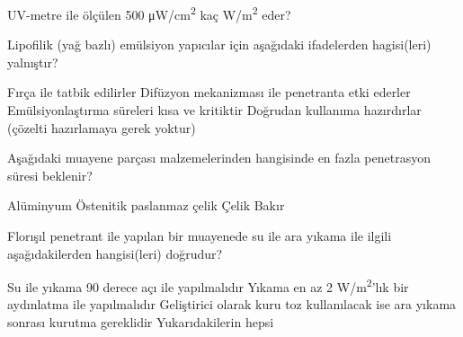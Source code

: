 \begin{question}[subtitle=]
  UV-metre ile ölçülen 500 \si[per-mode=symbol]{\micro\watt\per\centi\m^{2}} kaç \si[per-mode=symbol]
{\watt\per\m^{2}} eder?
	\begin{tasks}
           \correct
	\end{tasks}
\end{question}
\begin{solution}
	\correct
\end{solution}

\begin{question}[subtitle=]
  Lipofilik (yağ bazlı) emülsiyon yapıcılar için aşağıdaki ifadelerden hagisi(leri) yalnıştır?
	\begin{tasks}
          \task Fırça ile tatbik edilirler \correct
          \task Difüzyon mekanizması ile penetranta etki ederler
          \task Emülsiyonlaştırma süreleri kısa ve kritiktir
          \task Doğrudan kullanıma hazırdırlar (çözelti hazırlamaya gerek yoktur)
	\end{tasks}
\end{question}
\begin{solution}
	\correct
\end{solution}

\begin{question}[subtitle=]
  Aşağıdaki muayene parçası malzemelerinden hangisinde en fazla penetrasyon süresi beklenir?
	\begin{tasks}
          \task Alüminyum
          \task Östenitik paslanmaz çelik \correct
          \task Çelik
          \task Bakır
	\end{tasks}
\end{question}
\begin{solution}
	\correct
\end{solution}

\begin{question}[subtitle=]
  Florışıl penetrant ile yapılan bir muayenede su ile ara yıkama ile ilgili aşağıdakilerden
  hangisi(leri) doğrudur?
	\begin{tasks}
          \task Su ile yıkama 90 derece açı ile yapılmalıdır
          \task Yıkama en az 2 \si[per-mode=symbol] {\watt\per\m^{2}}'lık bir aydınlatma ile yapılmalıdır
          \task Geliştirici olarak kuru toz kullanılacak ise ara yıkama sonrası kurutma gereklidir \correct
          \task Yukarıdakilerin hepsi
	\end{tasks}
\end{question}
\begin{solution}
	\correct
\end{solution}

